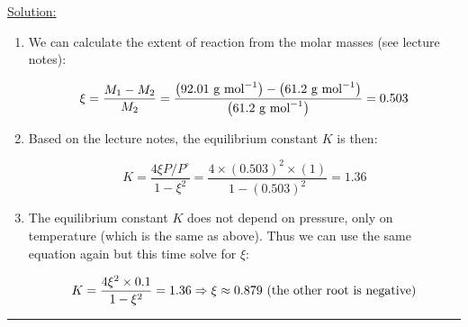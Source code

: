 \noindent
\underline{Solution:}

\begin{enumerate}
\item We can calculate the extent of reaction from the molar masses (see lecture notes):

$$\xi = \frac{M_1 - M_2}{M_2} = \frac{\left(92.01\textnormal{ g mol}^{-1}\right) - \left(61.2\textnormal{ g mol}^{-1}\right)}{\left(61.2\textnormal{ g mol}^{-1}\right)} = 0.503$$

\item Based on the lecture notes, the equilibrium constant $K$ is then:

$$K = \frac{4\xi P/P^\circ}{1 - \xi^2} = \frac{4\times \left(0.503\right)^2\times (1)}{1 - \left(0.503\right)^2} = 1.36$$

\item The equilibrium constant $K$ does not depend on pressure, only on temperature (which is the same as above). Thus we can use the same equation again but this time solve for $\xi$:

$$K = \frac{4\xi^2\times 0.1}{1 - \xi^2} = 1.36 \Rightarrow \xi\approx 0.879\textnormal{ (the other root is negative)}$$
\end{enumerate}
\hrule\vspace{0.5cm}
